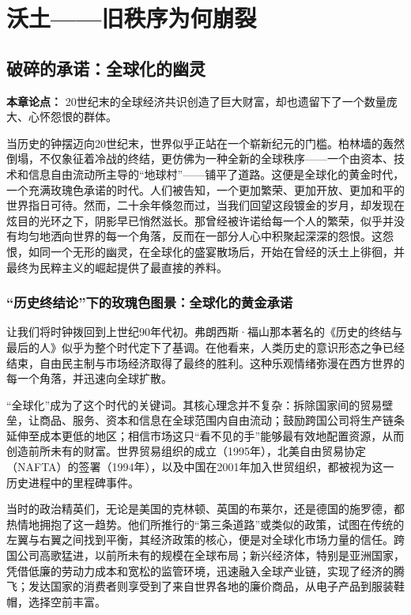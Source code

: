 \part{沃土——旧秩序为何崩裂}

\chapter{破碎的承诺：全球化的幽灵}

\textbf{本章论点：} 20世纪末的全球经济共识创造了巨大财富，却也遗留下了一个数量庞大、心怀怨恨的群体。

当历史的钟摆迈向20世纪末，世界似乎正站在一个崭新纪元的门槛。柏林墙的轰然倒塌，不仅象征着冷战的终结，更仿佛为一种全新的全球秩序——一个由资本、技术和信息自由流动所主导的“地球村”——铺平了道路。这便是全球化的黄金时代，一个充满玫瑰色承诺的时代。人们被告知，一个更加繁荣、更加开放、更加和平的世界指日可待。然而，二十余年倏忽而过，当我们回望这段镀金的岁月，却发现在炫目的光环之下，阴影早已悄然滋长。那曾经被许诺给每一个人的繁荣，似乎并没有均匀地洒向世界的每一个角落，反而在一部分人心中积聚起深深的怨恨。这怨恨，如同一个无形的幽灵，在全球化的盛宴散场后，开始在曾经的沃土上徘徊，并最终为民粹主义的崛起提供了最直接的养料。

\section{“历史终结论”下的玫瑰色图景：全球化的黄金承诺}

让我们将时钟拨回到上世纪90年代初。弗朗西斯·福山那本著名的《历史的终结与最后的人》似乎为整个时代定下了基调。在他看来，人类历史的意识形态之争已经结束，自由民主制与市场经济取得了最终的胜利。这种乐观情绪弥漫在西方世界的每一个角落，并迅速向全球扩散。

“全球化”成为了这个时代的关键词。其核心理念并不复杂：拆除国家间的贸易壁垒，让商品、服务、资本和信息在全球范围内自由流动；鼓励跨国公司将生产链条延伸至成本更低的地区；相信市场这只“看不见的手”能够最有效地配置资源，从而创造前所未有的财富。世界贸易组织的成立（1995年），北美自由贸易协定（NAFTA）的签署（1994年），以及中国在2001年加入世贸组织，都被视为这一历史进程中的里程碑事件。

当时的政治精英们，无论是美国的克林顿、英国的布莱尔，还是德国的施罗德，都热情地拥抱了这一趋势。他们所推行的“第三条道路”或类似的政策，试图在传统的左翼与右翼之间找到平衡，其经济政策的核心，便是对全球化市场力量的信任。跨国公司高歌猛进，以前所未有的规模在全球布局；新兴经济体，特别是亚洲国家，凭借低廉的劳动力成本和宽松的监管环境，迅速融入全球产业链，实现了经济的腾飞；发达国家的消费者则享受到了来自世界各地的廉价商品，从电子产品到服装鞋帽，选择空前丰富。

